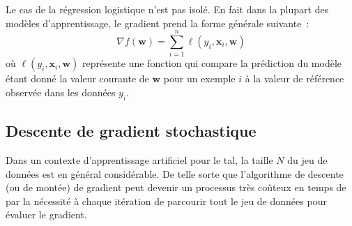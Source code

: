 \documentclass[11pt,openany]{book}
\newcommand{\ac}[1]{{\sc #1}} %
\begin{document}
Le cas de la régression logistique n'est pas isolé. En fait dans la
plupart des modèles d'apprentissage, le gradient prend la forme
générale suivante~:
\begin{equation}
\label{eq-sgd-gradient}
\nabla f(\mathbf{w}) = \sum_{i=1}^n  \ell(y_i, \mathbf{x}_{i} ,\mathbf{w})
\end{equation}
où $\ell(y_i, \mathbf{x}_{i} ,\mathbf{w})$ représente une fonction qui
compare la prédiction du modèle étant donné la valeur courante de $\mathbf{w}$
pour un exemple $i$ à la valeur de référence observée dans les données $y_i$.

\subsection{Descente de gradient stochastique}

Dans un contexte d'apprentissage artificiel pour le \ac{tal}, la
taille $N$ du jeu de données est en général considérable.
De telle sorte que l'algorithme de descente (ou de montée) de gradient
peut devenir un processus très coûteux en temps de par la nécessité à
chaque itération de parcourir tout le jeu de données pour évaluer le
gradient.
\end{document}
